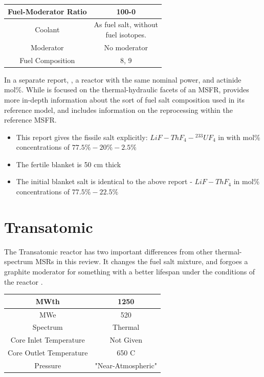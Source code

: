 \documentclass[letterpaper]{article}
\begin{document}
\begin{center}
\begin{tabular}{|c|c|}
\hline
Fuel-Moderator Ratio & 100-0 \\
\hline
Coolant & \makecell{As fuel salt, without\\fuel isotopes.} \\
\hline
Moderator & No moderator \\
\hline
Fuel Composition & 8, 9 \\
\hline
\end{tabular}
\end{center}

In a separate report, \cite{doligez_coupled_2014} , a reactor with the same nominal power, and actinide mol\%.   While \cite{rouch_preliminary_2014} is focused on the thermal-hydraulic facets of an MSFR, \cite{doligez_coupled_2014} provides more in-depth information about the sort of fuel salt composition used in its reference model, and includes information on the reprocessing within the reference MSFR.

\begin{itemize}
\item This report gives the fissile salt explicitly: $LiF - ThF_4 - {}^{233}UF_4$ in with mol\% concentrations of $77.5\% - 20\% - 2.5\%$
\item The fertile blanket is 50 cm thick
\item The initial blanket salt is identical to the above report - $LiF - ThF_4$ in mol\% concentrations of $77.5\% - 22.5\%$

\end{itemize}

\section{Transatomic}

The Transatomic reactor has two important differences from other thermal-spectrum MSRs in this review.  It changes the fuel salt mixture, and forgoes a graphite moderator for something with a better lifespan under the conditions of the reactor \cite{robertson_assessment_2017}.

\begin{center}
\begin{tabular}{|c|c|}
\hline
MWth & 1250 \\
\hline
MWe & 520 \\
\hline
Spectrum & Thermal \\
\hline
Core Inlet Temperature & Not Given \\
\hline
Core Outlet Temperature & 650 C\\
\hline
Pressure & "Near-Atmospheric" \\
\hline
\end{tabular}
\end{center}
\end{document}
